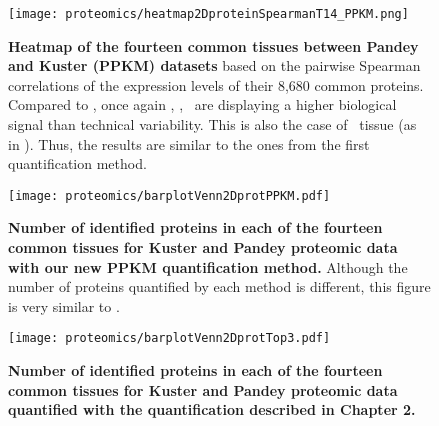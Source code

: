\begin{figure}[!htpb]
    \texttt{[image: proteomics/heatmap2DproteinSpearmanT14\_PPKM.png]}\centering
    \caption[Heatmap of the 14 common tissues between Pandey and Kuster
    (Spearman correlation --- PPKM)]{\label{fig:heatmap3DProtT14PPKM}\textbf{Heatmap
    of the fourteen common tissues between Pandey and Kuster (PPKM) datasets}
    based on the pairwise Spearman correlations of the expression levels of
    their 8,680 common proteins.
    Compared to ,
    once again \Placenta, \Lung, \Kidney\ are displaying a higher biological signal
    than technical variability.
    This is also the case of \Adrenal\ tissue (as in ).
    Thus, the results are similar to the ones from the first quantification method.}
\end{figure}


\begin{figure}[!htpb]
    \texttt{[image: proteomics/barplotVenn2DprotPPKM.pdf]}\centering
    \vspace{-3mm}
    \caption[Identified proteins across the 14 shared tissues for 2 datasets (PPKM)]{%
    \label{fig:barplot2DvennprotPPKM}\textbf{Number of identified proteins in
    each of the fourteen common tissues for Kuster and Pandey proteomic data
    with our new PPKM quantification method.}
    Although the number of proteins quantified by each method is different,
    this figure is very similar to .}
\end{figure}

\begin{figure}[!htpb]
    \texttt{[image: proteomics/barplotVenn2DprotTop3.pdf]}\centering
    \vspace{-3mm}
    \caption[Identified proteins across the 14 shared tissues for 2 datasets
    (first method)]{%
    \label{fig:barplot2DvennprotTop3}\textbf{Number of identified proteins in
    each of the fourteen common tissues for Kuster and Pandey proteomic data
    quantified with the quantification described in Chapter 2.}}
\end{figure}
